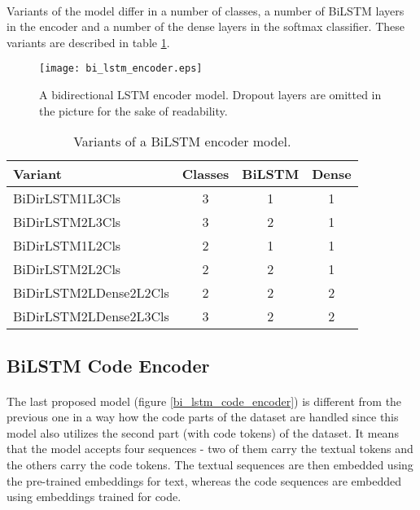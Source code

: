 \paragraph{}
Variants of the model differ in a number of classes, a number of BiLSTM layers in the encoder and a number of the dense layers in the softmax classifier. These variants are described in table \ref{bi_lstm_encoder_variants}.

\begin{figure}[!h]
	\texttt{[image: bi\_lstm\_encoder.eps]}
	\centering
	\caption{A bidirectional LSTM encoder model. Dropout layers are omitted in the picture for the sake of readability.}
	\label{bi_lstm_encoder}
\end{figure}

\begin{table}[!h]
	\begin{center}
		\begin{tabular}{l c c c } 
			\hline
			\textbf{Variant} & \textbf{Classes} & \textbf{BiLSTM} & \textbf{Dense} \\ [0.5ex] 
			\hline\hline
			BiDirLSTM1L3Cls & 3 & 1 & 1 \\ 
			BiDirLSTM2L3Cls & 3 & 2 & 1 \\ 
			BiDirLSTM1L2Cls & 2 & 1 & 1 \\ 
			BiDirLSTM2L2Cls & 2 & 2 & 1 \\ 
			BiDirLSTM2LDense2L2Cls & 2 & 2 & 2 \\ 
			BiDirLSTM2LDense2L3Cls & 3 & 2 & 2 \\ 
			\hline
		\end{tabular}
	\end{center}
	\caption{Variants of a BiLSTM encoder model.}
	\label{bi_lstm_encoder_variants}
\end{table}

\subsection{BiLSTM Code Encoder}
\paragraph{}
The last proposed model (figure \ref{bi_lstm_code_encoder}) is different from the previous one in a way how the code parts of the dataset are handled since this model also utilizes the second part (with code tokens) of the dataset. It means that the model accepts four sequences - two of them carry the textual tokens and the others carry the code tokens. The textual sequences are then embedded using the pre-trained embeddings for text, whereas the code sequences are embedded using embeddings trained for code.

